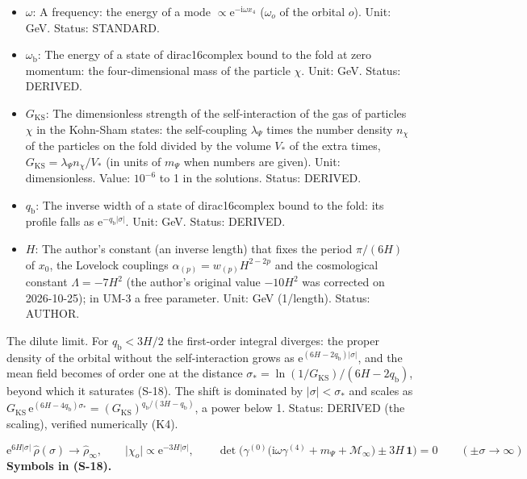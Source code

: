 \documentclass[
  10pt,
]{article}
\providecommand{\tightlist}{%
  \setlength{\itemsep}{0pt}\setlength{\parskip}{0pt}}
\begin{document}
\begin{itemize}
\tightlist
\item
  \(\omega\): A frequency: the energy of a mode
  \(\propto \mathrm{e}^{-\mathrm{i}\omega x_4}\) (\(\omega_o\) of the
  orbital \(o\)). Unit: GeV. Status: STANDARD.
\item
  \(\omega_{\mathrm{b}}\): The energy of a state of dirac16complex bound
  to the fold at zero momentum: the four-dimensional mass of the
  particle \(\chi\). Unit: GeV. Status: DERIVED.
\item
  \(G_{\mathrm{KS}}\): The dimensionless strength of the
  self-interaction of the gas of particles \(\chi\) in the Kohn-Sham
  states: the self-coupling \(\lambda_\Psi\) times the number density
  \(n_\chi\) of the particles on the fold divided by the volume \(V_*\)
  of the extra times, \(G_{\mathrm{KS}} = \lambda_\Psi n_\chi/V_*\) (in
  units of \(m_\Psi\) when numbers are given). Unit: dimensionless.
  Value: \(10^{-6}\) to 1 in the solutions. Status: DERIVED.
\item
  \(q_{\mathrm{b}}\): The inverse width of a state of dirac16complex
  bound to the fold: its profile falls as
  \(\mathrm{e}^{-q_{\mathrm{b}}\lvert\sigma\rvert}\). Unit: GeV. Status:
  DERIVED.
\item
  \(H\): The author's constant (an inverse length) that fixes the period
  \(\pi/(6H)\) of \(x_0\), the Lovelock couplings
  \(\alpha_{(p)} = w_{(p)}H^{2-2p}\) and the cosmological constant
  \(\Lambda = -7H^2\) (the author's original value \(-10H^2\) was
  corrected on 2026-10-25); in UM-3 a free parameter. Unit: GeV
  (1/length). Status: AUTHOR.
\end{itemize}

The dilute limit. For \(q_{\mathrm{b}} < 3H/2\) the first-order integral
diverges: the proper density of the orbital without the self-interaction
grows as \(\mathrm{e}^{(6H - 2q_{\mathrm{b}})\lvert\sigma\rvert}\), and
the mean field becomes of order one at the distance
\(\sigma_* = \ln(1/G_{\mathrm{KS}})/(6H - 2q_{\mathrm{b}})\), beyond
which it saturates (S-18). The shift is dominated by
\(\lvert\sigma\rvert < \sigma_*\) and scales as
\(G_{\mathrm{KS}}\,\mathrm{e}^{(6H - 4q_{\mathrm{b}})\sigma_*} = (G_{\mathrm{KS}})^{q_{\mathrm{b}}/(3H - q_{\mathrm{b}})}\),
a power below 1. Status: DERIVED (the scaling), verified numerically
(K4).

\[
\mathrm{e}^{6H\lvert\sigma\rvert}\,\hat\rho(\sigma) \to \hat\rho_\infty,\qquad \lvert\chi_o\rvert \propto \mathrm{e}^{-3H\lvert\sigma\rvert},\qquad
\det\Big(\gamma^{(0)}\big(\mathrm{i}\omega\gamma^{(4)} + m_\Psi + \mathcal{M}_\infty\big) \pm 3H\,\mathbf{1}\Big) = 0\qquad(\pm\sigma \to \infty) \tag{S-18}
\] \textbf{Symbols in (S-18).}
\end{document}
